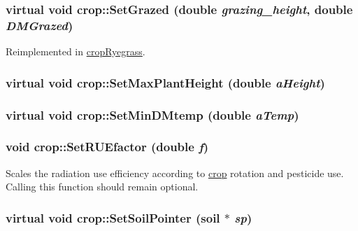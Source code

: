 \label{classcrop_aa079c1db3cb10a86a58a3efa0f2e51a9}
\hypertarget{classcrop_a29e704e7767db2f9270128fefc1a74c7}{
\subsubsection[{SetGrazed}]{\setlength{\rightskip}{0pt plus 5cm}virtual void crop::SetGrazed (double {\em grazing\_\-height}, \/  double {\em DMGrazed})}}
\label{classcrop_a29e704e7767db2f9270128fefc1a74c7}


Reimplemented in \hyperlink{classcrop_ryegrass_a64930de42e02d7aa99becc169c5a8b19}{cropRyegrass}.\hypertarget{classcrop_ab5f2bbf268e6d623d0a69cc4a37049fb}{
\subsubsection[{SetMaxPlantHeight}]{\setlength{\rightskip}{0pt plus 5cm}virtual void crop::SetMaxPlantHeight (double {\em aHeight})}}
\label{classcrop_ab5f2bbf268e6d623d0a69cc4a37049fb}
\hypertarget{classcrop_a9b0b91147d9172c43e4ea336e5b2d3f8}{
\subsubsection[{SetMinDMtemp}]{\setlength{\rightskip}{0pt plus 5cm}virtual void crop::SetMinDMtemp (double {\em aTemp})}}
\label{classcrop_a9b0b91147d9172c43e4ea336e5b2d3f8}
\hypertarget{classcrop_a750cc1981b6d1fcb6e1a1e43bb22accf}{
\subsubsection[{SetRUEfactor}]{\setlength{\rightskip}{0pt plus 5cm}void crop::SetRUEfactor (double {\em f})}}
\label{classcrop_a750cc1981b6d1fcb6e1a1e43bb22accf}
Scales the radiation use efficiency according to \hyperlink{classcrop}{crop} rotation and pesticide use. Calling this function should remain optional. \hypertarget{classcrop_a68b4dca8529ca2be2d18541a4249bba5}{
\subsubsection[{SetSoilPointer}]{\setlength{\rightskip}{0pt plus 5cm}virtual void crop::SetSoilPointer ({\bf soil} $\ast$ {\em sp})}}
